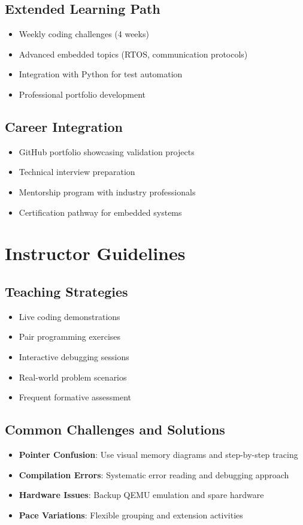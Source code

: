 \documentclass[11pt,a4paper]{article}
\begin{document}
\subsection{Extended Learning Path}
\begin{itemize}
    \item Weekly coding challenges (4 weeks)
    \item Advanced embedded topics (RTOS, communication protocols)
    \item Integration with Python for test automation
    \item Professional portfolio development
\end{itemize}

\subsection{Career Integration}
\begin{itemize}
    \item GitHub portfolio showcasing validation projects
    \item Technical interview preparation
    \item Mentorship program with industry professionals
    \item Certification pathway for embedded systems
\end{itemize}

\section{Instructor Guidelines}

\subsection{Teaching Strategies}
\begin{itemize}
    \item Live coding demonstrations
    \item Pair programming exercises
    \item Interactive debugging sessions
    \item Real-world problem scenarios
    \item Frequent formative assessment
\end{itemize}

\subsection{Common Challenges and Solutions}
\begin{itemize}
    \item \textbf{Pointer Confusion}: Use visual memory diagrams and step-by-step tracing
    \item \textbf{Compilation Errors}: Systematic error reading and debugging approach
    \item \textbf{Hardware Issues}: Backup QEMU emulation and spare hardware
    \item \textbf{Pace Variations}: Flexible grouping and extension activities
\end{itemize}
\end{document}
